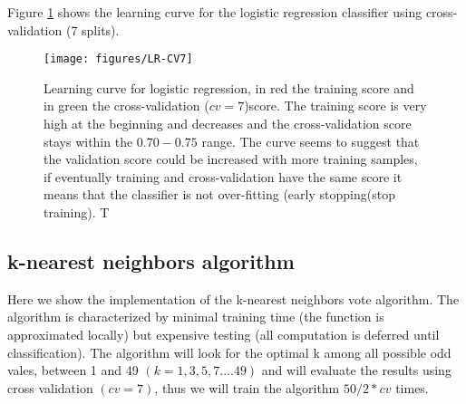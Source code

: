 \documentclass[11pt]{article}
\begin{document}
Figure \ref{fig:lr-cv7} shows the learning curve for the logistic regression classifier using cross-validation (7 splits).
\begin{figure}[H]
        \centering
        \texttt{[image: figures/LR-CV7]}
        \caption{Learning curve for logistic regression, in red the training score and in green the cross-validation ($cv=7$)score. The training score is very high at the beginning and decreases and the cross-validation score stays within the $0.70-0.75$ range. The curve seems to suggest that the validation score could be increased with more training samples, if eventually training and cross-validation have the same score it means that the classifier is not over-fitting (early stopping(stop training). T
        }
\label{fig:lr-cv7}
\end{figure}


\subsection{k-nearest neighbors algorithm}
\label{se:reskneighbors}
Here we show the implementation of the k-nearest neighbors vote algorithm. The algorithm is characterized by minimal training time (the function is approximated locally) but expensive testing (all computation is deferred until classification).
The algorithm will look for the optimal k among all possible odd vales, between 1 and 49 $(k=1,3,5,7....49)$ and will evaluate the results using cross validation $(cv=7)$, thus we will train the algorithm $50/2*cv$ times. 
\end{document}
